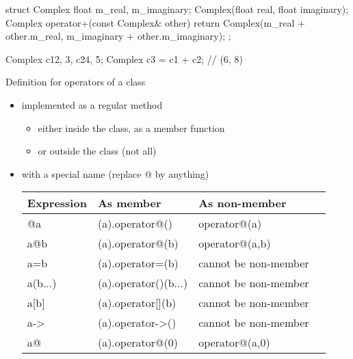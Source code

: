 \begin{frame}[fragile]
  \begin{cppcode}
    struct Complex {
      float m_real, m_imaginary;
      Complex(float real, float imaginary);
      Complex operator+(const Complex& other) {
        return Complex(m_real + other.m_real,
                       m_imaginary + other.m_imaginary);
      }
    };

    Complex c1{2, 3}, c2{4, 5};
    Complex c3 = c1 + c2; // (6, 8)
  \end{cppcode}
\end{frame}

\begin{frame}
  \begin{block}{Definition for operators of a class}
    \begin{itemize}
    \item implemented as a regular method
      \begin{itemize}
      \item either inside the class, as a member function
      \item or outside the class (not all)
      \end{itemize}
    \item with a special name (replace @ by anything)
      \begin{tabular}{llll}
        Expression & As member & As non-member \\
        \hline
        @a & (a).operator@() & operator@(a) \\
        a@b & (a).operator@(b) & operator@(a,b) \\
        a=b & (a).operator=(b) & cannot be non-member \\
        a(b...) & (a).operator()(b...) & cannot be non-member \\
        a[b] & (a).operator[](b) & cannot be non-member \\
        a-\textgreater & (a).operator-\textgreater() & cannot be non-member \\
        a@ & (a).operator@(0) & operator@(a,0) \\
      \end{tabular}
    \end{itemize}
  \end{block}
\end{frame}

